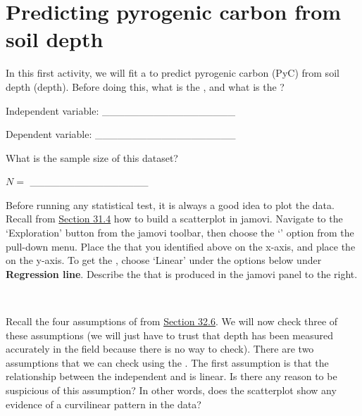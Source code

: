 \documentclass[
  openany]{krantz}
\begin{document}
\hypertarget{predicting-pyrogenic-carbon-from-soil-depth}{%
\section{Predicting pyrogenic carbon from soil depth}\label{predicting-pyrogenic-carbon-from-soil-depth}}

In this first activity, we will fit a  to predict pyrogenic carbon (PyC) from soil depth (depth).
Before doing this, what is the , and what is the ?

Independent variable: \_\_\_\_\_\_\_\_\_\_\_\_\_\_\_\_\_\_

Dependent variable: \_\_\_\_\_\_\_\_\_\_\_\_\_\_\_\_\_\_\_

What is the sample size of this dataset?

\(N =\) \_\_\_\_\_\_\_\_\_\_\_\_\_\_\_\_

Before running any statistical test, it is always a good idea to plot the data.
Recall from \protect\hyperlink{pearson-product-moment-correlation-test}{Section 31.4} how to build a scatterplot in jamovi.
Navigate to the `Exploration' button from the jamovi toolbar, then choose the `' option from the pull-down menu.
Place the  that you identified above on the x-axis, and place the  on the y-axis.
To get the , choose `Linear' under the options below under \textbf{Regression line}.
Describe the  that is produced in the jamovi panel to the right.

\begin{verbatim}


\end{verbatim}

Recall the four assumptions of  from \protect\hyperlink{regression-assumptions}{Section 32.6}.
We will now check three of these assumptions (we will just have to trust that depth has been measured accurately in the field because there is no way to check).
There are two assumptions that we can check using the .
The first assumption is that the relationship between the independent and  is linear.
Is there any reason to be suspicious of this assumption?
In other words, does the scatterplot show any evidence of a curvilinear pattern in the data?
\end{document}
